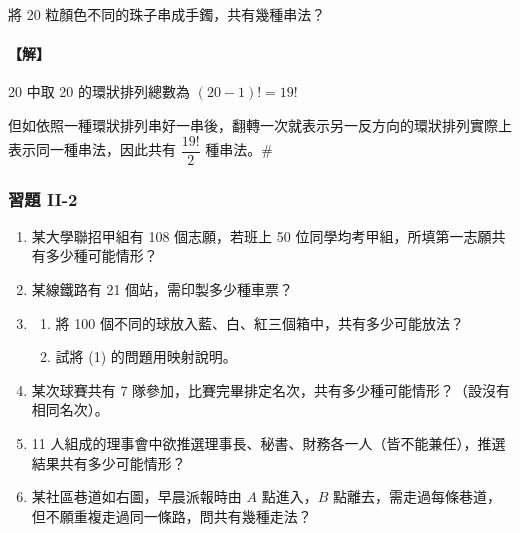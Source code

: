 \begin{example}\label{ex:b5s-2-13}
將 20 粒顏色不同的珠子串成手鐲，共有幾種串法？
\end{example}
\paragraph{【解】}
20 中取 20 的環狀排列總數為 $(20-1)! = 19!$

但如依照一種環狀排列串好一串後，翻轉一次就表示另一反方向的環狀排列實際上表示同一種串法，因此共有 $\dfrac{19!}{2}$ 種串法。\hfill\#

\subsubsection*{習題 II-2}

\begin{enumerate}[label=\arabic*., topsep=4pt, itemsep=6pt]
  \item 某大學聯招甲組有 108 個志願，若班上 50 位同學均考甲組，所填第一志願共有多少種可能情形？
  \item 某線鐵路有 21 個站，需印製多少種車票？
  \item
  \begin{enumerate}[label=(\arabic*), topsep=2pt, itemsep=2pt]
    \item 將 100 個不同的球放入藍、白、紅三個箱中，共有多少可能放法？
    \item 試將 (1) 的問題用映射說明。
  \end{enumerate}
  \item 某次球賽共有 7 隊參加，比賽完畢排定名次，共有多少種可能情形？（設沒有相同名次）。
  \item 11 人組成的理事會中欲推選理事長、秘書、財務各一人（皆不能兼任），推選結果共有多少可能情形？
  \item
  \begin{minipage}[t]{0.68\linewidth}
  某社區巷道如右圖，\footnotemark 早晨派報時由 $A$ 點進入，$B$ 點離去，需走過每條巷道，但不願重複走過同一條路，問共有幾種走法？
  \end{minipage}\hfill
  \begin{minipage}[t]{0.30\linewidth}
  \centering
  \end{minipage}%
  \label{note:b5s-ch2-p75-q6-quote}


\end{enumerate}
